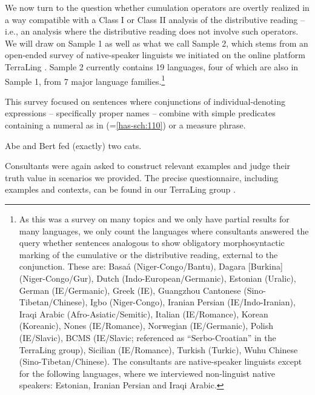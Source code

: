\documentclass[output=paper]{langscibook}
\begin{document}
We now turn to the question whether cumulation operators are overtly realized in a way compatible with a Class I or Class II analysis of the distributive reading -- i.e., an analysis where the distributive reading does not involve such operators. We will draw on Sample 1 as well as what we call  Sample 2, which stems from an open-ended survey of native-speaker linguists we initiated on the online platform TerraLing \citep{terraling}.
 Sample 2 currently contains 19 languages, four of which are also in Sample 1, from 7 major language families.\footnote{As this was a survey on many topics and we only have partial results for many languages, we only count the languages where consultants answered the query whether sentences analogous to  show obligatory morphosyntactic marking of the cumulative or the distributive reading, external to the conjunction. These are: Basaá (Niger-Congo/Bantu), Dagara [Burkina] (Niger-Congo/Gur), Dutch (Indo-European/Germanic), Estonian (Uralic), German (IE/Germanic), Greek (IE), Guangzhou Cantonese (Sino-Tibetan/Chinese), Igbo (Niger-Congo), Iranian Persian (IE/Indo-Iranian), Iraqi Arabic (Afro-Asiatic/Semitic), Italian (IE/Romance), Korean (Koreanic), Nones (IE/Romance), Norwegian (IE/Germanic), Polish (IE/Slavic), BCMS (IE/Slavic; referenced as ``Serbo-Croatian'' in the TerraLing group), Sicilian (IE/Romance), Turkish (Turkic), Wuhu Chinese (Sino-Tibetan/Chinese). The consultants are native-speaker linguists except for the following languages, where we interviewed non-linguist native speakers: Estonian, Iranian Persian and Iraqi Arabic.} 

This survey focused  on sentences where conjunctions of individual-denoting expressions -- specifically proper names -- combine with simple predicates containing a numeral as in  (=\ref{has-sch:110}) or a measure phrase.

\ea \label{has-sch:110} Abe and Bert fed (exactly) two cats.
\z

\noindent Consultants were again asked to construct relevant examples 
and judge their truth value in scenarios we provided. The precise questionnaire, including examples and contexts, can be found in our TerraLing group \citep{conjunction}.
\end{document}

